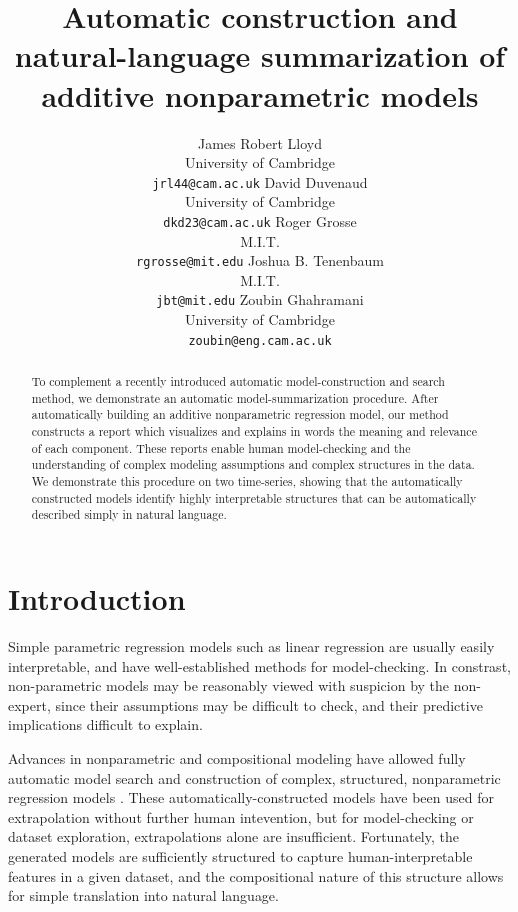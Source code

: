 \documentclass{article} %
\title{Automatic construction and natural-language summarization of additive nonparametric models}
\author{
James Robert Lloyd\\
University of Cambridge\\
\texttt{jrl44@cam.ac.uk}
\And
David Duvenaud\\
University of Cambridge \\
\texttt{dkd23@cam.ac.uk}
\And
Roger Grosse\\
M.I.T.\\
\texttt{rgrosse@mit.edu}
\And
Joshua B. Tenenbaum\\
M.I.T.\\
\texttt{jbt@mit.edu}
\And
Zoubin Ghahramani\\
University of Cambridge \\
\texttt{zoubin@eng.cam.ac.uk}
}
\begin{document}
\allowdisplaybreaks

\maketitle

\begin{abstract}
To complement a recently introduced automatic model-construction and search method, we demonstrate an automatic model-summarization procedure.
After automatically building an additive nonparametric regression model, our method constructs a report which visualizes and explains in words the meaning and relevance of each component.
These reports enable human model-checking and the understanding of complex modeling assumptions and complex structures in the data.
We demonstrate this procedure on two time-series, showing that the automatically constructed models identify highly interpretable structures that can be automatically described simply in natural language.
\end{abstract}

\section{Introduction}


Simple parametric regression models such as linear regression are usually easily interpretable, and have well-established methods for model-checking.
In constrast, non-parametric models may be reasonably viewed with suspicion by the non-expert, since their assumptions may be difficult to check, and their predictive implications difficult to explain.

Advances in nonparametric and compositional modeling have allowed fully automatic model search and construction of complex, structured, nonparametric regression models \cite{DuvLloGroetal13}.
These automatically-constructed models have been used for extrapolation without further human intevention, but for model-checking or dataset exploration, extrapolations alone are insufficient.  
Fortunately, the generated models are sufficiently structured to capture human-interpretable features in a given dataset, and the compositional nature of this structure allows for simple translation into natural language.
\end{document}
